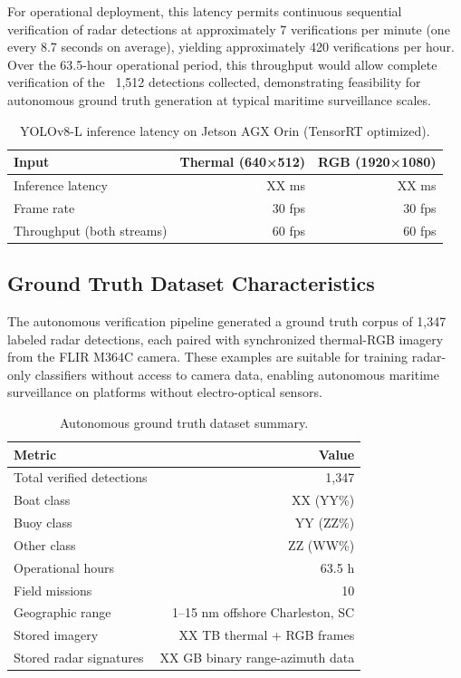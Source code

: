 \documentclass[conf]{asmeconf}
\begin{document}
For operational deployment, this latency permits continuous sequential verification of radar detections at approximately 7 verifications per minute (one every 8.7 seconds on average), yielding approximately 420 verifications per hour. Over the 63.5-hour operational period, this throughput would allow complete verification of the ~1,512 detections collected, demonstrating feasibility for autonomous ground truth generation at typical maritime surveillance scales.

\begin{table}[t]
\caption{YOLOv8-L inference latency on Jetson AGX Orin (TensorRT optimized).}
\label{tab:inference_latency}
\centering
\small
\begin{tabular}{@{}lrr@{}}
\toprule
Input & Thermal (640×512) & RGB (1920×1080) \\
\midrule
Inference latency & XX ms & XX ms \\
Frame rate & 30 fps & 30 fps \\
Throughput (both streams) & 60 fps & 60 fps \\
\bottomrule
\end{tabular}
\end{table}

\subsection{Ground Truth Dataset Characteristics}

The autonomous verification pipeline generated a ground truth corpus of 1,347 labeled radar detections, each paired with synchronized thermal-RGB imagery from the FLIR M364C camera. These examples are suitable for training radar-only classifiers without access to camera data, enabling autonomous maritime surveillance on platforms without electro-optical sensors.

\begin{table}[t]
\caption{Autonomous ground truth dataset summary.}
\label{tab:dataset_summary}
\centering
\small
\begin{tabular}{@{}lr@{}}
\toprule
Metric & Value \\
\midrule
Total verified detections & 1,347 \\
Boat class & XX (YY\%) \\
Buoy class & YY (ZZ\%) \\
Other class & ZZ (WW\%) \\
\midrule
Operational hours & 63.5 h \\
Field missions & 10 \\
Geographic range & 1--15 nm offshore Charleston, SC \\
\midrule
Stored imagery & XX TB thermal + RGB frames \\
Stored radar signatures & XX GB binary range-azimuth data \\
\bottomrule
\end{tabular}
\end{table}
\end{document}
